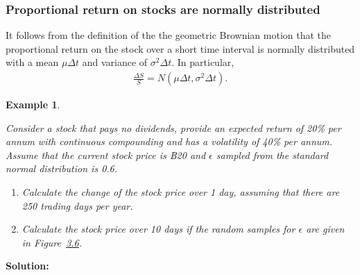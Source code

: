 \documentclass[landscape, 20pt]{extreport}
\theoremstyle{definition}
\theoremstyle{definition}
\newtheorem{example}{Example}[chapter]
\theoremstyle{definition}
\theoremstyle{definition}
\theoremstyle{remark}
\begin{document}
\hypertarget{proportional-return-on-stocks-are-normally-distributed}{%
\subsubsection{Proportional return on stocks are normally distributed}\label{proportional-return-on-stocks-are-normally-distributed}}

It follows from the definition of the the geometric Brownian motion that
the proportional return on the stock over a short time interval is
normally distributed with a mean \(\mu \Delta t\) and variance of
\(\sigma^2 \Delta t\). In particular, \[\begin{aligned}
\label{propReturn}
\frac{\Delta S}{S} = N( \mu \Delta t , \sigma^2  \Delta t).\end{aligned}\]

\newpage \begin{example}
\protect\hypertarget{exm:unlabeled-div-72}{}\label{exm:unlabeled-div-72}

\emph{Consider a stock that pays no dividends, provide an
expected return of 20\% per annum with continuous compounding and has a
volatility of 40\% per annum. Assume that the current stock price is ฿20
and \(\epsilon\) sampled from the standard normal distribution is 0.6.}

\begin{enumerate}
\def\labelenumi{\arabic{enumi}.}
\item
  \emph{Calculate the change of the stock price over 1 day, assuming that
  there are 250 trading days per year.}
\item
  \emph{Calculate the stock price over 10 days if the random samples for
  \(\epsilon\) are given in Figure~\protect\hyperlink{fig:GBM}{3.6}.}
\end{enumerate}

\end{example}

\textbf{Solution:}
\end{document}
